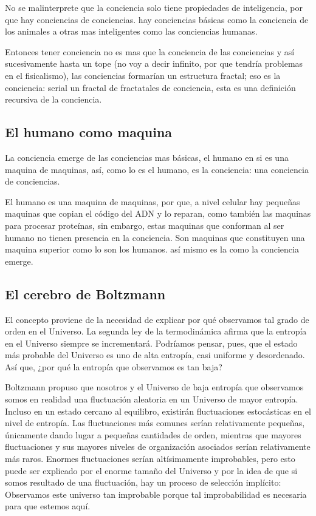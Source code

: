 \documentclass[12pt,letterpaper, a4paper ]{article}
\begin{document}
No se malinterprete que la conciencia solo tiene propiedades de inteligencia, por que hay conciencias de conciencias. hay conciencias básicas como la conciencia de los animales a otras mas inteligentes como las conciencias humanas.

Entonces tener conciencia no es mas que la conciencia de las conciencias y así sucesivamente hasta un tope (no voy a decir infinito, por que tendría problemas en el fisicalismo), las conciencias formarían un estructura fractal; eso es la conciencia: serial un fractal de fractatales de conciencia, esta es una definición recursiva de la conciencia.

\subsection{El humano como maquina}

La conciencia emerge de las conciencias mas básicas, el humano en si es una maquina de maquinas, así, como lo es el humano, es la conciencia: una conciencia de conciencias.

El humano es una maquina de maquinas, por que, a nivel celular hay pequeñas maquinas que copian el código del ADN y lo reparan, como también las maquinas para procesar proteínas, sin embargo, estas maquinas que conforman al ser humano no tienen presencia en la conciencia. Son maquinas que constituyen una maquina superior como lo son los humanos. así mismo es la como la conciencia emerge.

\subsection{El cerebro de Boltzmann}


El concepto proviene de la necesidad de explicar por qué observamos tal grado de orden en el Universo. La segunda ley de la termodinámica afirma que la entropía en el Universo siempre se incrementará. Podríamos pensar, pues, que el estado más probable del Universo es uno de alta entropía, casi uniforme y desordenado. Así que, ¿por qué la entropía que observamos es tan baja?

Boltzmann propuso que nosotros y el Universo de baja entropía que observamos somos en realidad una fluctuación aleatoria en un Universo de mayor entropía. Incluso en un estado cercano al equilibro, existirán fluctuaciones estocásticas en el nivel de entropía. Las fluctuaciones más comunes serían relativamente pequeñas, únicamente dando lugar a pequeñas cantidades de orden, mientras que mayores fluctuaciones y sus mayores niveles de organización asociados serían relativamente más raros. Enormes fluctuaciones serían altísimamente improbables, pero esto puede ser explicado por el enorme tamaño del Universo y por la idea de que si somos resultado de una fluctuación, hay un proceso de selección implícito: Observamos este universo tan improbable porque tal improbabilidad es necesaria para que estemos aquí.
\end{document}
